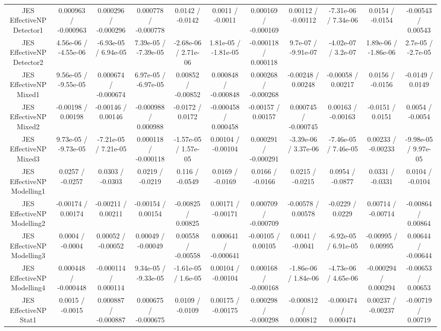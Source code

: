 \begin{table}[htbp]
\begin{center}
\begin{tabular}{|c|c|c|c|c|c|c|c|c|c|c|}
  JES EffectiveNP Detector1 & 0.000963 / -0.000963 & 0.000296 / -0.000296 & 0.000778 / -0.000778 & 0.0142 / -0.0142 & 0.0011 / -0.0011 & 0.000169 / -0.000169 & 0.00112 / -0.00112 & -7.31e-06 / 7.34e-06 & 0.0154 / -0.0154 & -0.00543 / 0.00543 \\ 
  JES EffectiveNP Detector2 & 4.56e-06 / -4.55e-06 & -6.93e-05 / 6.94e-05 & 7.39e-05 / -7.39e-05 & -2.68e-06 / 2.71e-06 & 1.81e-05 / -1.81e-05 & -0.000118 / 0.000118 & 9.7e-07 / -9.91e-07 & -4.02e-07 / 3.2e-07 & 1.89e-06 / -1.86e-06 & 2.7e-05 / -2.7e-05 \\ 
  JES EffectiveNP Mixed1 & 9.56e-05 / -9.55e-05 & 0.000674 / -0.000674 & 6.97e-05 / -6.97e-05 & 0.00852 / -0.00852 & 0.000848 / -0.000848 & 0.000268 / -0.000268 & -0.00248 / 0.00248 & -0.00058 / 0.00217 & 0.0156 / -0.0156 & -0.0149 / 0.0149 \\ 
  JES EffectiveNP Mixed2 & -0.00198 / 0.00198 & -0.00146 / 0.00146 & -0.000988 / 0.000988 & -0.0172 / 0.0172 & -0.000458 / 0.000458 & -0.00157 / 0.00157 & 0.000745 / -0.000745 & 0.00163 / -0.00163 & -0.0151 / 0.0151 & 0.0054 / -0.0054 \\ 
  JES EffectiveNP Mixed3 & 9.73e-05 / -9.73e-05 & -7.21e-05 / 7.21e-05 & 0.000118 / -0.000118 & -1.57e-05 / 1.57e-05 & 0.00104 / -0.00104 & 0.000291 / -0.000291 & -3.39e-06 / 3.37e-06 & -7.46e-05 / 7.46e-05 & 0.00233 / -0.00233 & -9.98e-05 / 9.97e-05 \\ 
  JES EffectiveNP Modelling1 & 0.0257 / -0.0257 & 0.0303 / -0.0303 & 0.0219 / -0.0219 & 0.116 / -0.0549 & 0.0169 / -0.0169 & 0.0166 / -0.0166 & 0.0215 / -0.0215 & 0.0954 / -0.0877 & 0.0331 / -0.0331 & 0.0104 / -0.0104 \\ 
  JES EffectiveNP Modelling2 & -0.00174 / 0.00174 & -0.00211 / 0.00211 & -0.00154 / 0.00154 & -0.00825 / 0.00825 & 0.00171 / -0.00171 & 0.000709 / -0.000709 & -0.00578 / 0.00578 & -0.0229 / 0.0229 & 0.00714 / -0.00714 & -0.00864 / 0.00864 \\ 
  JES EffectiveNP Modelling3 & 0.0004 / -0.0004 & 0.00052 / -0.00052 & 0.00049 / -0.00049 & 0.00558 / -0.00558 & 0.000641 / -0.000641 & -0.00105 / 0.00105 & 0.0041 / -0.0041 & -6.92e-05 / 6.91e-05 & -0.00995 / 0.00995 & 0.00644 / -0.00644 \\ 
  JES EffectiveNP Modelling4 & 0.000448 / -0.000448 & -0.000114 / 0.000114 & 9.34e-05 / -9.33e-05 & -1.61e-05 / 1.6e-05 & 0.00104 / -0.00104 & 0.000168 / -0.000168 & -1.86e-06 / 1.84e-06 & -4.73e-06 / 4.65e-06 & -0.000294 / 0.000294 & -0.00653 / 0.00653 \\ 
  JES EffectiveNP Stat1 & 0.0015 / -0.0015 & 0.000887 / -0.000887 & 0.000675 / -0.000675 & 0.0109 / -0.0109 & 0.00175 / -0.00175 & 0.000298 / -0.000298 & -0.000812 / 0.000812 & -0.000474 / 0.000474 & 0.00237 / -0.00237 & -0.00719 / 0.00719 \\ 

\end{tabular}
\end{center}
\end{table}
